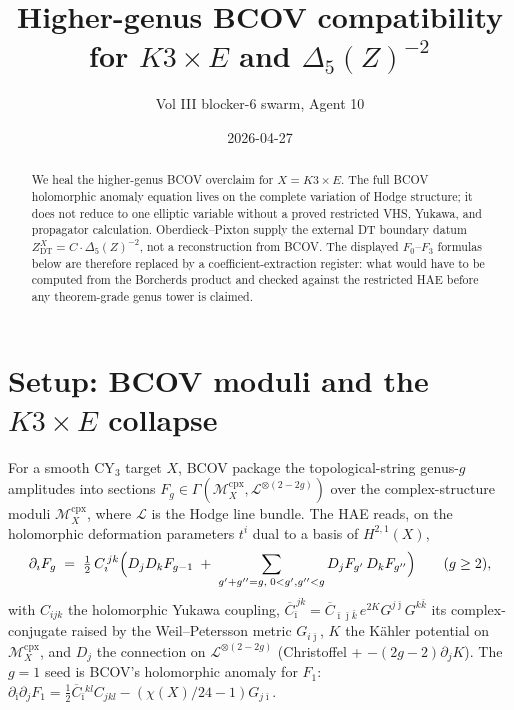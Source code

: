 \documentclass[11pt]{article}
\title{Higher-genus BCOV compatibility for $K3\times E$ and $\Delta_5(Z)^{-2}$}
\author{Vol III blocker-6 swarm, Agent 10}
\date{2026-04-27}
\theoremstyle{plain}
\theoremstyle{definition}
\theoremstyle{remark}
\providecommand{\cM}{\mathcal{M}}
\providecommand{\cL}{\mathcal{L}}
\begin{document}
\maketitle

\begin{abstract}
We heal the higher-genus BCOV overclaim for $X=K3\times E$. The full
BCOV holomorphic anomaly equation lives on the complete variation of
Hodge structure; it does not reduce to one elliptic variable without a
proved restricted VHS, Yukawa, and propagator calculation.
Oberdieck--Pixton supply the external DT boundary datum
$Z^X_{\mathrm{DT}}=C\cdot\Delta_5(Z)^{-2}$, not a reconstruction from
BCOV. The displayed $F_0$--$F_3$ formulas below are therefore replaced
by a coefficient-extraction register: what would have to be computed
from the Borcherds product and checked against the restricted HAE before
any theorem-grade genus tower is claimed.
\end{abstract}

\section{Setup: BCOV moduli and the $K3\times E$ collapse}
\label{sec:setup}

For a smooth CY$_3$ target $X$, BCOV
\cite{BCOV1993, BCOV1994} package the topological-string genus-$g$
amplitudes into sections
$F_g \in \Gamma(\cM_X^{\mathrm{cpx}}, \cL^{\otimes(2-2g)})$ over the
complex-structure moduli $\cM_X^{\mathrm{cpx}}$, where $\cL$ is the
Hodge line bundle. The HAE reads, on the holomorphic deformation
parameters $t^i$ dual to a basis of $H^{2,1}(X)$,
\begin{equation}
\label{eq:hae}
\partial_{\bar\imath} F_g
\;=\; \tfrac{1}{2}\, \overline{C}_{\bar\imath}^{\,jk}
\Bigl( D_j D_k F_{g-1} \;+\; \sum_{g'+g''=g,\; 0<g',g''<g}
       D_j F_{g'}\, D_k F_{g''} \Bigr)
\qquad (g\ge 2),
\end{equation}
with $C_{ijk}$ the holomorphic Yukawa coupling, $\overline{C}_{\bar
\imath}^{\,jk} = \overline{C}_{\bar\imath\bar\jmath\bar k}\,
e^{2K} G^{j\bar\jmath}G^{k\bar k}$ its complex-conjugate raised by the
Weil--Petersson metric $G_{i\bar\jmath}$, $K$ the K\"ahler potential
on $\cM_X^{\mathrm{cpx}}$, and $D_j$ the connection on
$\cL^{\otimes(2-2g)}$ (Christoffel + $-(2g-2)\partial_j K$). The $g=1$
seed is BCOV's holomorphic anomaly for $F_1$:
$\partial_{\bar\imath}\partial_j F_1 = \tfrac{1}{2}
\overline{C}_{\bar\imath}{}^{kl}C_{jkl} - (\chi(X)/24 - 1)
G_{j\bar\imath}$.
\end{document}
